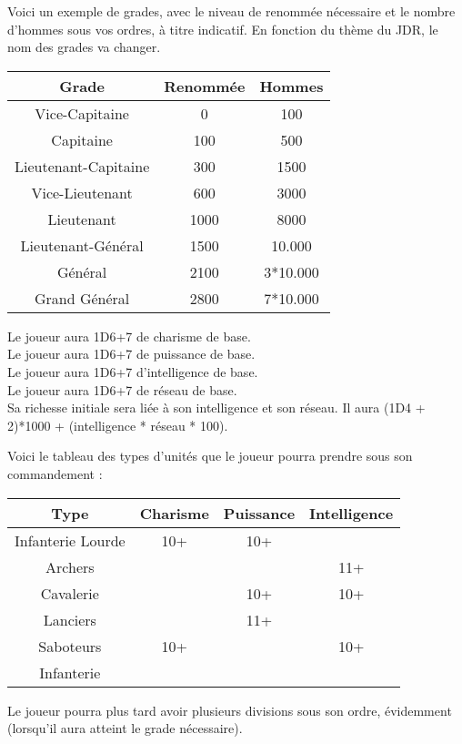 \documentclass[french]{article}
\begin{document}
Voici un exemple de grades, avec le niveau de renommée nécessaire et le nombre d'hommes sous vos ordres, à titre indicatif. En fonction du thème du JDR, le nom des grades va changer.

\begin{tabular}{| c | c | c |}
\hline
\textbf{Grade} & \textbf{Renommée} & \textbf{Hommes}\\
\hline
Vice-Capitaine & 0 & 100\\
\hline
Capitaine & 100 & 500\\
\hline
Lieutenant-Capitaine & 300 & 1500\\
\hline
Vice-Lieutenant & 600 & 3000\\
\hline
Lieutenant & 1000 & 8000\\
\hline
Lieutenant-Général & 1500 & 10.000\\
\hline
Général & 2100 & 3*10.000\\
\hline
Grand Général & 2800 & 7*10.000\\
\hline
\end{tabular}

Le joueur aura 1D6+7 de charisme de base.\\
Le joueur aura 1D6+7 de puissance de base.\\
Le joueur aura 1D6+7 d'intelligence de base.\\
Le joueur aura 1D6+7 de réseau de base.\\

Sa richesse initiale sera liée à son intelligence et son réseau. Il aura (1D4 + 2)*1000 + (intelligence * réseau * 100).

Voici le tableau des types d'unités que le joueur pourra prendre sous son commandement :


\begin{tabular}{| c | c | c | c |}
\hline
\textbf{Type} & \textbf{Charisme} & \textbf{Puissance} & \textbf{Intelligence}\\
\hline
Infanterie Lourde & 10+ & 10+ & \\
\hline
Archers & & & 11+\\
\hline
Cavalerie & & 10+ & 10+\\
\hline
Lanciers & & 11+ & \\
\hline
Saboteurs & 10+ & & 10+\\
\hline
Infanterie & & &\\
\hline
\end{tabular}

Le joueur pourra plus tard avoir plusieurs divisions sous son ordre, évidemment (lorsqu'il aura atteint le grade nécessaire).
\end{document}
